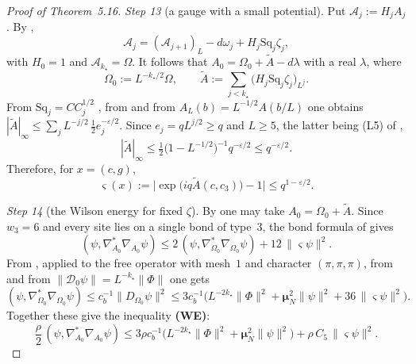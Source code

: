 \documentclass[11pt,letterpaper,reqno]{amsart}
\theoremstyle{definition}
\begin{document}
\begin{proof}[Proof of Theorem~5.16]
\emph{Step 13} (a gauge with a small potential).
Put $\mathscr A_j:=H_jA_j$.
By \cite[Proposition~5.52\,(iii)]{QEDI},
\begin{equation*}
\mathscr A_j=(\mathscr A_{j+1})_L-d\omega_j+H_j\mathrm{Sq}_j\zeta_j,
\end{equation*}
with $H_0=1$ and $\mathscr A_{k_\star}=\Omega$.
It follows that $A_0=\Omega_0+\tilde A-d\lambda$ with a real $\lambda$, where
\begin{equation*}
\Omega_0:=L^{-k_\star/2}\Omega,\qquad\tilde A:=\sum_{j<k_\star}\bigl(H_j\mathrm{Sq}_j\zeta_j\bigr)_{L^j}.
\end{equation*}
From $\mathrm{Sq}_j=CC_j^{1/2}$ \cite{QEDI}, from \cite[Proposition~5.38\,(iii)]{QEDI} and from $A_L(b)=L^{-1/2}A(b/L)$ one obtains $|\tilde A|_\infty\le\sum_jL^{-j/2}\,\frac12e_j^{-\varepsilon/2}$.
Since $e_j=qL^{j/2}\ge q$ and $L\ge5$, the latter being (L5) of \cite[Proposition~14.2\,(b)]{QEDIII},
\begin{equation*}
|\tilde A|_\infty\le\tfrac12\bigl(1-L^{-1/2}\bigr)^{-1}q^{-\varepsilon/2}\le q^{-\varepsilon/2}.
\end{equation*}
Therefore, for $x=(c,g)$,
\begin{equation*}
\varsigma(x):=\bigl|\exp\bigl(iq\tilde A(c,c_3)\bigr)-1\bigr|\le q^{1-\varepsilon/2}.
\end{equation*}

\emph{Step 14} (the Wilson energy for fixed $\zeta$).
By \cite[(I.O4)]{QEDIII} one may take $A_0=\Omega_0+\tilde A$.
Since $w_3=6$ and every site lies on a single bond of type~$3$, the bond formula of \cite[(I.O2)]{QEDIII} gives
\begin{equation*}
(\psi,\nabla^*_{A_0}\nabla_{A_0}\psi)\le2\,(\psi,\nabla^*_{\Omega_0}\nabla_{\Omega_0}\psi)+12\,\|\varsigma\psi\|^2 .
\end{equation*}
From \cite[Proposition~1.3\,(b)]{QEDIII}, applied to the free operator with mesh~$1$ and character $(\pi,\pi,\pi)$, from \cite[(I.O6)]{QEDIII} and from $\|\mathcal D_0\psi\|=L^{-k_\star}\|\Phi\|$ one gets
\begin{equation*}
(\psi,\nabla^*_{\Omega_0}\nabla_{\Omega_0}\psi)\le c_b^{-1}\|D_{\Omega_0}\psi\|^2\le3c_b^{-1}\bigl(L^{-2k_\star}\|\Phi\|^2+\boldsymbol\mu_N^2\|\psi\|^2+36\,\|\varsigma\psi\|^2\bigr).
\end{equation*}
Together these give the inequality \textbf{(WE)}:
\begin{equation}
\tag{WE}
\frac\rho2\,(\psi,\nabla^*_{A_0}\nabla_{A_0}\psi)\le3\rho c_b^{-1}\bigl(L^{-2k_\star}\|\Phi\|^2+\boldsymbol\mu_N^2\|\psi\|^2\bigr)+\rho\,C_5\,\|\varsigma\psi\|^2 .
\end{equation}


\end{proof}
\end{document}
